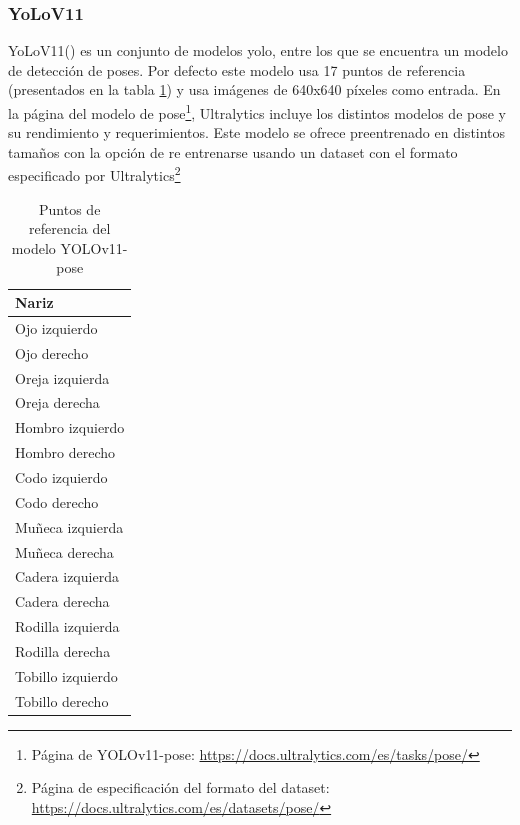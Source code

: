 \subsubsection{YoLoV11}
YoLoV11(\cite{Jocher_Ultralytics_YOLO_2023}) es un conjunto de modelos \gls{yolo}, entre los que se encuentra un modelo de detección de poses. Por defecto este modelo usa 17 puntos de referencia (presentados en la tabla \ref{tab:pose-yolo}) y usa imágenes de 640x640 píxeles como entrada. En la página del modelo de pose\footnote{Página de YOLOv11-pose: \url{https://docs.ultralytics.com/es/tasks/pose/}}, Ultralytics incluye los distintos modelos de pose y su rendimiento y requerimientos. Este modelo se ofrece preentrenado en distintos tamaños con la opción de re entrenarse usando un dataset con el formato especificado por Ultralytics\footnote{Página de especificación del formato del dataset: \url{https://docs.ultralytics.com/es/datasets/pose/}}

\begin{table}[H]
    \centering
    \caption{Puntos de referencia del modelo YOLOv11-pose}
    \label{tab:pose-yolo}
    \begin{tabular}{|l|}
        \hline
        Nariz             \\
        \hline
        Ojo izquierdo     \\
        \hline
        Ojo derecho       \\
        \hline
        Oreja izquierda   \\
        \hline
        Oreja derecha     \\
        \hline
        Hombro izquierdo  \\
        \hline
        Hombro derecho    \\
        \hline
        Codo izquierdo    \\
        \hline
        Codo derecho      \\
        \hline
        Muñeca izquierda  \\
        \hline
        Muñeca derecha    \\
        \hline
        Cadera izquierda  \\
        \hline
        Cadera derecha    \\
        \hline
        Rodilla izquierda \\
        \hline
        Rodilla derecha   \\
        \hline
        Tobillo izquierdo \\
        \hline
        Tobillo derecho   \\
        \hline
    \end{tabular}
\end{table}

